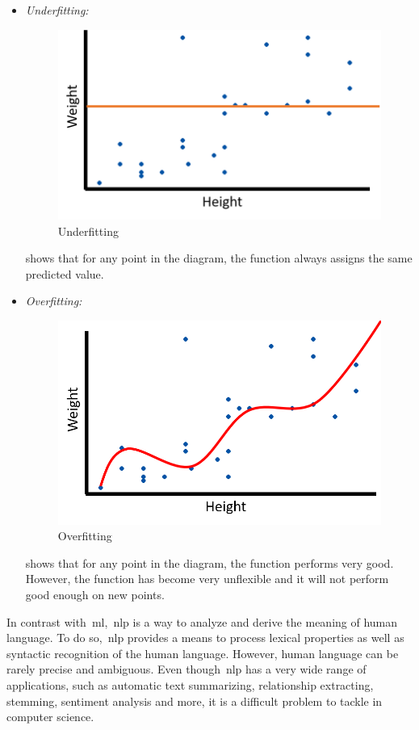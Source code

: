 \begin{itemize}
	\item \textit{Underfitting:}
	\begin{figure}
		\includegraphics[width=\linewidth]{img/underfit.png}
		\caption{Underfitting~\cite{gs}}
		\label{fig:underfit}
	\end{figure}
 shows that for any point in the diagram, the function always assigns the same predicted value.
	\item \textit{Overfitting:} 
		\begin{figure}
		\includegraphics[width=\linewidth]{img/overfit.png}
		\caption{Overfitting~\cite{gs}}
		\label{fig:overfit}
	\end{figure}
 shows that for any point in the diagram, the function performs very good. However, the function has become very unflexible and it will not perform good enough on new points.
\end{itemize}
In contrast with~\ac{ml},~\ac{nlp} is a way to analyze and derive the meaning of human language. To do so,~\ac{nlp} provides a means to process lexical properties as well as syntactic recognition of the human language. However, human language can be rarely precise and ambiguous. Even though~\ac{nlp} has a very wide range of applications, such as automatic text summarizing, relationship extracting, stemming, sentiment analysis and more, it is a difficult problem to tackle in computer science.

